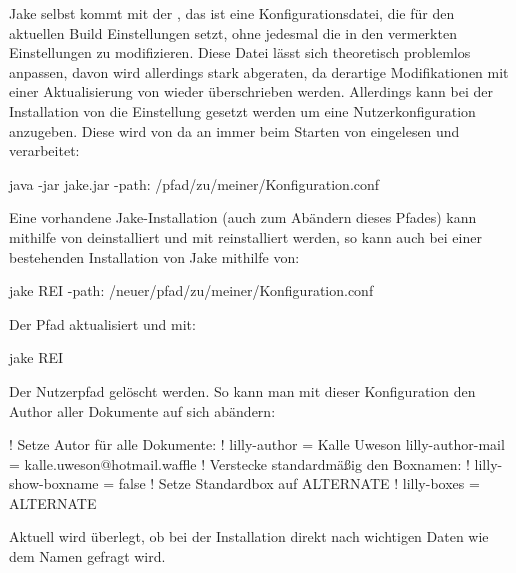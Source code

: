 \begin{bemerkung}[Standartkonfigurationsdateien]
    Jake selbst kommt mit der , das ist eine Konfigurationsdatei, die für den aktuellen Build Einstellungen setzt, ohne jedesmal die in den  vermerkten Einstellungen zu modifizieren. Diese Datei lässt sich theoretisch problemlos anpassen, davon wird allerdings stark abgeraten, da derartige Modifikationen mit einer Aktualisierung von \Jake wieder überschrieben werden. Allerdings kann bei der Installation von \Jake die Einstellung  gesetzt werden um eine Nutzerkonfiguration anzugeben. Diese wird von da an immer beim Starten von \Jake eingelesen und verarbeitet:
    \begin{bash*}
java -jar jake.jar -path: /pfad/zu/meiner/Konfiguration.conf
    \end{bash*}
    Eine vorhandene Jake-Installation (auch zum Abändern dieses Pfades) kann mithilfe von  deinstalliert und mit  reinstalliert werden, so kann auch bei einer bestehenden Installation von Jake mithilfe von:
    \begin{bash*}
jake REI -path: /neuer/pfad/zu/meiner/Konfiguration.conf
    \end{bash*}
    Der Pfad aktualisiert und mit:
    \begin{bash*}
jake REI
    \end{bash*}
    Der Nutzerpfad gelöscht werden. So kann man mit dieser Konfiguration den Author aller Dokumente auf sich abändern:
    \begin{gepard}
! Setze Autor für alle Dokumente: !
lilly-author       = Kalle Uweson
lilly-author-mail  = kalle.uweson@hotmail.waffle
! Verstecke standardmäßig den Boxnamen: !
lilly-show-boxname = false
! Setze Standardbox auf ALTERNATE !
lilly-boxes        = ALTERNATE
    \end{gepard}
    Aktuell wird überlegt, ob bei der Installation direkt nach wichtigen Daten wie dem Namen gefragt wird.
\end{bemerkung}

